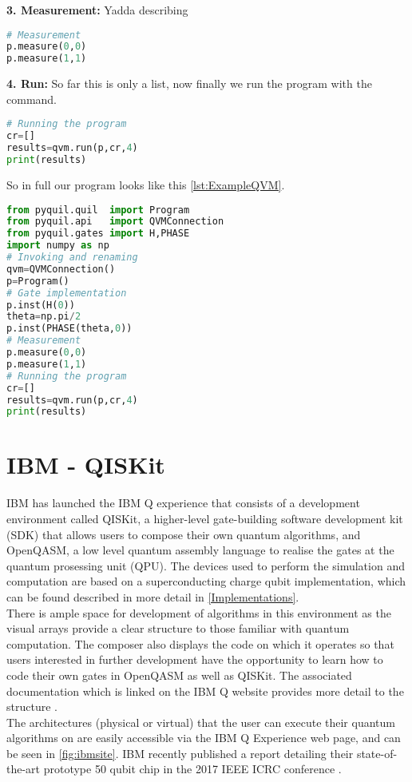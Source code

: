 {\bf 3. Measurement:} Yadda describing 
\begin{lstlisting}[language=Python]
# Measurement
p.measure(0,0)
p.measure(1,1)
\end{lstlisting}
 
{\bf 4. Run:} So far this is only a list, now finally we run the program with the command.
\begin{lstlisting}[language=Python]
# Running the program
cr=[]
results=qvm.run(p,cr,4)
print(results)
\end{lstlisting}
So in full our program looks like this \autoref{lst:ExampleQVM}.
\begin{lstlisting}[language=Python,caption={Example algorithm implemented with pyQuil.},label={lst:ExampleQVM},frame=single] 
from pyquil.quil  import Program 
from pyquil.api   import QVMConnection 
from pyquil.gates import H,PHASE
import numpy as np
# Invoking and renaming
qvm=QVMConnection()
p=Program()
# Gate implementation
p.inst(H(0))
theta=np.pi/2
p.inst(PHASE(theta,0))
# Measurement
p.measure(0,0)
p.measure(1,1)
# Running the program
cr=[]
results=qvm.run(p,cr,4)
print(results)
\end{lstlisting}


\section{IBM - QISKit}

IBM has launched the IBM Q experience that consists of a development environment called QISKit, a higher-level gate-building software development kit (SDK) that allows users to compose their own quantum algorithms, and OpenQASM, a low level quantum assembly language to realise the gates at the quantum prosessing unit (QPU). The devices used to perform the simulation and computation are based on a superconducting charge qubit implementation, which can be found described in more detail in \autoref{Implementations}. \\
\indent There is ample space for development of algorithms in this environment as the visual arrays provide a clear structure to those familiar with quantum computation. The composer also displays the code on which it operates so that users interested in further development have the opportunity to learn how to code their own gates in OpenQASM as well as QISKit. The associated documentation which is linked on the IBM Q website provides more detail to the structure \cite{coles2018quantum}. \\
\indent The architectures (physical or virtual) that the user can execute their quantum algorithms on are easily accessible via the IBM Q Experience web page, and can be seen in \autoref{fig:ibmsite}. IBM recently published a report detailing their state-of-the-art prototype 50 qubit chip in the 2017 IEEE ICRC conference \cite{ibm50}.\\

